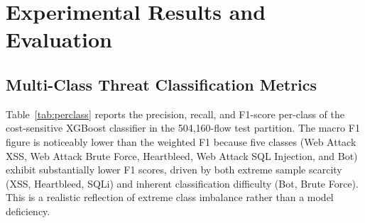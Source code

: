 \documentclass[conference]{IEEEtran}
\begin{document}
\section{Experimental Results and Evaluation}

\subsection{Multi-Class Threat Classification Metrics}
Table~\ref{tab:perclass} reports the precision, recall, and F1-score per-class of the cost-sensitive XGBoost classifier in the 504{,}160-flow test partition. The macro F1 figure is noticeably lower than the weighted F1 because 
five classes (Web Attack XSS, Web Attack Brute Force, Heartbleed, 
Web Attack SQL Injection, and Bot) exhibit substantially lower F1 
scores, driven by both extreme sample scarcity (XSS, Heartbleed, 
SQLi) and inherent classification difficulty (Bot, Brute Force). 
This is a realistic reflection of extreme class imbalance rather 
than a model deficiency.
\end{document}
